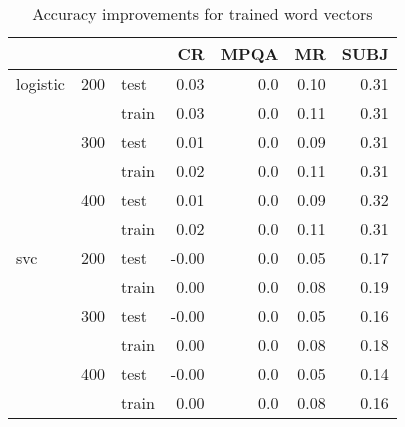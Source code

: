     \begin{table}[H]
    \begin{center}
    
    \begin{tabular}{lllrrrr}
    \toprule
     & &&CR &MPQA &MR &SUBJ \\
    \midrule
    logistic & 200 & test & 0.03 &0.0 & 0.10 & 0.31 \\
     & & train & 0.03 &0.0 & 0.11 & 0.31 \\
     & 300 & test & 0.01 &0.0 & 0.09 & 0.31 \\
     & & train & 0.02 &0.0 & 0.11 & 0.31 \\
     & 400 & test & 0.01 &0.0 & 0.09 & 0.32 \\
     & & train & 0.02 &0.0 & 0.11 & 0.31 \\
    svc & 200 & test &-0.00 &0.0 & 0.05 & 0.17 \\
     & & train & 0.00 &0.0 & 0.08 & 0.19 \\
     & 300 & test &-0.00 &0.0 & 0.05 & 0.16 \\
     & & train & 0.00 &0.0 & 0.08 & 0.18 \\
     & 400 & test &-0.00 &0.0 & 0.05 & 0.14 \\
     & & train & 0.00 &0.0 & 0.08 & 0.16 \\
    \bottomrule
    \end{tabular}
    
    
    \caption[Accuracy improvements for trained word vectors]{Accuracy improvements for trained word vectors}
    \label{tab:res:trainedwordvec}
    \end{center}
    \end{table}

